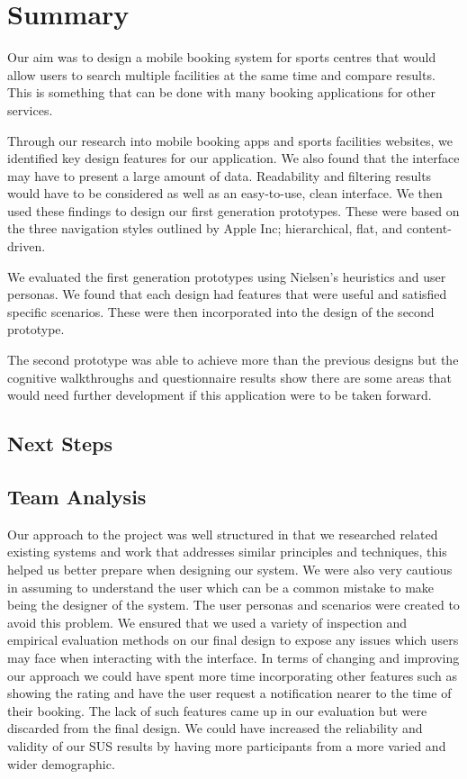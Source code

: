 \section{Summary}
\label{sec:summary}

Our aim was to design a mobile booking system for sports centres that would
allow users to search multiple facilities at the same time and compare results.
This is something that can be done with many booking applications for other
services.

Through our research into mobile booking apps and sports facilities websites,
we identified key design features for our application. We also found that the
interface may have to present a large amount of data. Readability and filtering
results would have to be considered as well as an easy-to-use, clean interface.
We then used these findings to design our first generation prototypes. These
were based on the three navigation styles outlined by Apple Inc; hierarchical,
flat, and content-driven.

We evaluated the first generation prototypes using Nielsen’s heuristics and
user personas. We found that each design had features that were useful and
satisfied specific scenarios. These were then incorporated into the design of
the second prototype.

The second prototype was able to achieve more than the previous designs but the
cognitive walkthroughs and questionnaire results show there are some areas that
would need further development if this application were to be taken forward.

\subsection{Next Steps}
\label{sub:next_steps}


\subsection{Team Analysis}
\label{sub:team_analysis}

Our approach to the project was well structured in that we researched related
existing systems and work that addresses similar principles and techniques,
this helped us better prepare when designing our system. We were also very
cautious in assuming to understand the user which can be a common mistake to
make being the designer of the system. The user personas and scenarios were
created to avoid this problem. We ensured that we used a variety of inspection
and empirical evaluation methods on our final design to expose any issues which
users may face when interacting with the interface.  In terms of changing and
improving our approach we could have spent more time incorporating other
features such as showing the rating and have the user request a notification
nearer to the time of their booking. The lack of such features came up in our
evaluation but were discarded from the final design. We could have increased
the reliability and validity of our SUS results by having more participants
from a more varied and wider demographic.

